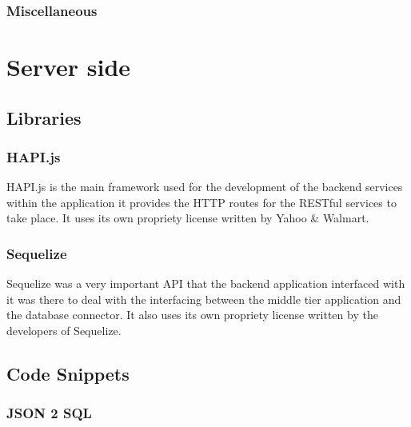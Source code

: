 \subsubsection*{Miscellaneous}



\section{Server side}


\subsection{Libraries}

\subsubsection*{HAPI.js}

HAPI.js \cite{hapiteam:hapti:2015:online} is the main framework used for the development of the backend services within the application it provides the HTTP routes for the RESTful services to take place. It uses its own propriety license written by Yahoo \& Walmart.

\subsubsection*{Sequelize}

Sequelize was a very important API that the backend application interfaced with it was there to deal with the interfacing between the middle tier application and the database connector. It also uses its own propriety license written by the developers of Sequelize.

\subsection{Code Snippets}

\subsubsection*{JSON 2 SQL}


